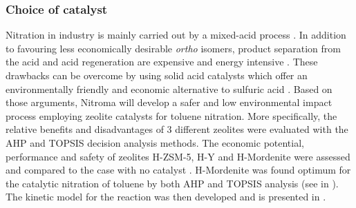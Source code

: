 \subsubsection{Choice of catalyst}
Nitration in industry is mainly carried out by a mixed-acid process \cite{halder_nitration_2007}. In addition to favouring less economically desirable \textit{ortho} isomers, product separation from the acid and acid regeneration are expensive and energy intensive \cite{sreedhar_scientific_2013}. These drawbacks can be overcome by using solid acid catalysts which offer an environmentally friendly and economic alternative to sulfuric acid \cite{vassena_selective_1999}. Based on those arguments, Nitroma will develop a safer and low environmental impact process employing zeolite catalysts for toluene nitration. More specifically, the relative benefits and disadvantages of 3 different zeolites were evaluated with the AHP and TOPSIS decision analysis methods. The economic potential, performance and safety of zeolites H-ZSM-5, H-Y and H-Mordenite were assessed and compared to the case with no catalyst \cite{jeeru_kinetics_2018}. H-Mordenite was found optimum for the catalytic nitration of toluene by both AHP and TOPSIS analysis (see  in ). The kinetic model for the reaction was then developed and is presented in .

\begin{comment}
Nitration in industry is mainly carried out by a mixed-acid process, whereby sulfuric acid donates a proton to nitric acid, yielding a nitronium ion which will then react with toluene []. In addition to favouring less economically desirable \textit{ortho} isomers, product separation from the acid and acid regeneration are expensive and energy intensive \cite{sreedhar_scientific_2013}. These drawbacks can be overcome by using solid acid catalysts which offer an environmentally friendly and economic alternative to sulfuric acid \cite{vassena_selective_1999}. Based on those arguments, Nitroma will develop a safer and low environmental impact process employing zeolite catalysts for toluene nitration. More specifically, the relative benefits and disadvantages of 3 different zeolites were evaluated with the AHP and TOPSIS decision analysis methods to select the optimum catalyst. The economic potential, performance and safety of zeolites H-ZSM-5, H-Y and H-Mordenite were assessed and compared to the case with no catalyst \cite{jeeru_kinetics_2018}. The economic potential was measured with the cost of the catalyst and the percentage of undesirable by-product formed. Conversion and the NFPA score are the KPIs for performance and safety respectively. H-Mordenite was found optimum for the catalytic nitration of toluene by both AHP and TOPSIS analysis (see \Cref{app:matrix}). The kinetic model for the reaction was then developed and is presented in \Cref{app:kinetics}.
\end{comment}

